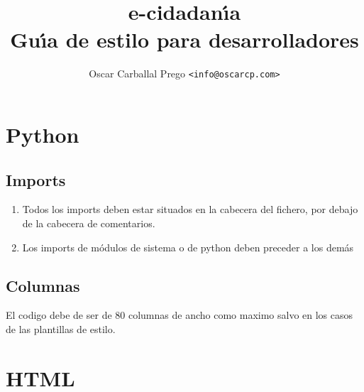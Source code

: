\documentclass[a4paper, 10pt]{report}
\begin{document}
\title{e-cidadan\'{\i}a\\ Gu\'{\i}a de estilo para desarrolladores}
\author{Oscar Carballal Prego \texttt{<info@oscarcp.com>}}

\maketitle
\newpage 

\tableofcontents
\newpage

\chapter{Python}

\section{Imports}
	\begin{enumerate}
		\item Todos los imports deben estar situados en la cabecera del fichero, por debajo de la cabecera de comentarios.
		\item Los imports de m\'{o}dulos de sistema o de python deben preceder a los dem\'{a}s
	\end{enumerate}

\section{Columnas}
El codigo debe de ser de 80 columnas de ancho como maximo salvo en los casos de las plantillas de estilo.

\chapter{HTML}
\end{document}
